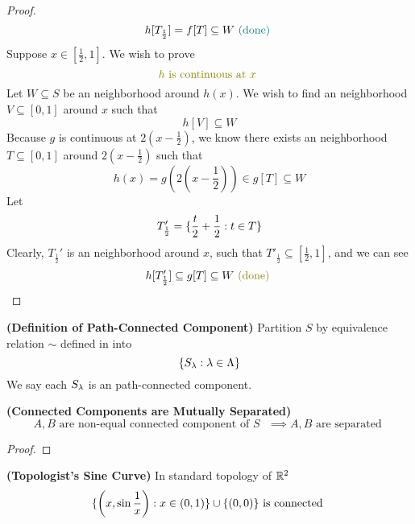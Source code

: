 \documentclass{report}
\begin{document}
\begin{proof}
\begin{equation*}
 h[T_{\frac{1}{2}}]=f[T]\subseteq W\textcolor{teal}{\text{ (done) }}
\end{equation*}
Suppose $x\in [\frac{1}{2},1]$. We wish to prove 
\begin{equation*}
\olive{h\text{ is continuous at $x$ }}
\end{equation*}
Let $W\subseteq S$ be an neighborhood around $h(x)$. We wish to find an neighborhood $V\subseteq [0,1]$ around $x$ such that 
\begin{equation*}
h[V]\subseteq W
\end{equation*}
Because $g$ is continuous at $2(x-\frac{1}{2})$, we know there exists an neighborhood $T\subseteq [0,1]$ around $2(x-\frac{1}{2})$ such that 
\begin{equation*}
h(x)=g(2(x-\frac{1}{2}))\in g[T]\subseteq W
\end{equation*}
Let 
\begin{equation*}
T_{\frac{1}{2}}'=\{ \frac{t}{2}+\frac{1}{2}:t \in T \}
\end{equation*}
Clearly, $T_{\frac{1}{2}}'$ is an neighborhood around $x$, such that  $T'_{\frac{1}{2}}\subseteq [\frac{1}{2},1]$, and we can see
\begin{equation*}
h[T'_{\frac{1}{2}}]\subseteq g[T]\subseteq W\odone
\end{equation*}
\end{proof}
\begin{definition}
\label{2.3.9}
\textbf{(Definition of Path-Connected Component)} Partition $S$ by equivalence relation  $\sim$ defined in  into 
\begin{equation*}
\{ S_\lambda:\lambda  \in \Lambda  \}
\end{equation*}
We say each $S_\lambda $ is an path-connected component.
\end{definition}
\begin{theorem}
\label{2.3.10}
\textbf{(Connected Components are Mutually Separated)} 
\begin{equation*}
A,B\text{ are non-equal connected component of $S$ }\implies A,B\text{ are separated }
\end{equation*}
\end{theorem}
\begin{proof}

\end{proof}
\begin{theorem}
\label{2.3.11}
\textbf{(Topologist's Sine Curve)} In standard topology of $\mathbb{R}^2$
 \begin{equation*}
\{ \left(x,\sin \frac{1}{x} \right):x\in \left(0,1 \right) \}\cup \{ \left(0,0 \right) \}\text{ is connected }
\end{equation*}
\end{theorem}
\end{document}
